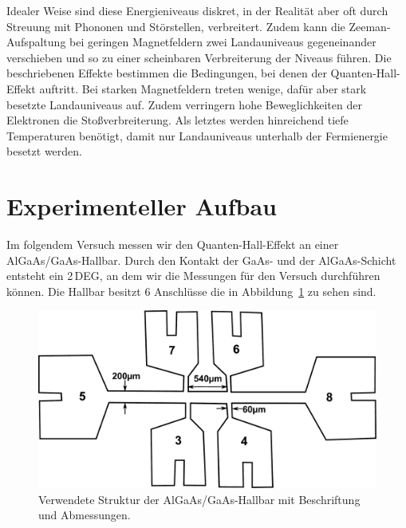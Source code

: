 \documentclass[paper=a4,fontsize=10pt,DIV=18,twocolumn,parskip=half]{scrartcl}
\numberwithin{equation}{section}    %
\begin{document}
Idealer Weise sind diese Energieniveaus diskret, in der Realität aber oft durch Streuung mit Phononen und Störstellen, verbreitert. Zudem kann die Zeeman-Aufspaltung bei geringen Magnetfeldern zwei Landauniveaus gegeneinander verschieben und so zu einer scheinbaren Verbreiterung der Niveaus führen. Die beschriebenen Effekte bestimmen die Bedingungen, bei denen der Quanten-Hall-Effekt auftritt. Bei starken Magnetfeldern treten wenige, dafür aber stark besetzte Landauniveaus auf. Zudem verringern hohe Beweglichkeiten der Elektronen die Stoßverbreiterung. Als letztes werden hinreichend tiefe Temperaturen benötigt, damit nur Landauniveaus unterhalb der Fermienergie besetzt werden.\\


%
\section{Experimenteller Aufbau}
\label{Experiment}
%
Im folgendem Versuch messen wir den Quanten-Hall-Effekt an einer AlGaAs/GaAs-Hallbar. Durch den Kontakt der GaAs- und der AlGaAs-Schicht entsteht ein 2\,DEG, an dem wir die Messungen für den Versuch durchführen können. Die Hallbar besitzt 6 Anschlüsse die in Abbildung~\ref{fig.hallbar} zu sehen sind. 

\begin{figure}[htp]
	\begin{center}
		\includegraphics[width=.8\columnwidth]{Bilder/hallbar.pdf}
		\caption{Verwendete Struktur der AlGaAs/GaAs-Hallbar mit Beschriftung und Abmessungen.}
		\label{fig.hallbar}
	\end{center}
\end{figure}
\end{document}
